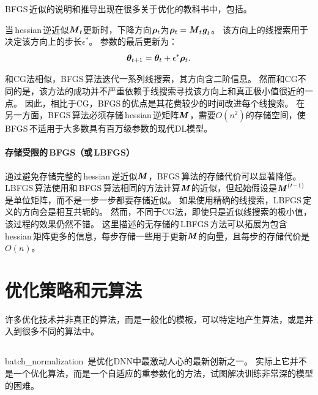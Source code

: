 
\gls{BFGS}\,近似的说明和推导出现在很多关于优化的教科书中，包括\cite{Lue84}。

当\,\gls{hessian}\,逆近似$\boldsymbol{\mathit{M}}_t$更新时，下降方向$\boldsymbol{\rho}_t$为$\boldsymbol{\rho}_t = \boldsymbol{\mathit{M}}_t \boldsymbol{\mathit{g}}_t$。
该方向上的线搜索用于决定该方向上的步长$\epsilon^*$。
参数的最后更新为：
\begin{equation}
    \boldsymbol{\theta}_{t+1} = \boldsymbol{\theta}_t + \epsilon^* \boldsymbol{\rho}_t.
\end{equation}

和\gls{CG}法相似，\gls{BFGS}\,算法迭代一系列线搜索，其方向含二阶信息。
然而和\gls{CG}不同的是，该方法的成功并不严重依赖于线搜索寻找该方向上和真正极小值很近的一点。
因此，相比于\gls{CG}，\gls{BFGS}\,的优点是其花费较少的时间改进每个线搜索。
在另一方面，\gls{BFGS}\,算法必须存储\,\gls{hessian}\,逆矩阵$\boldsymbol{\mathit{M}}$，需要$O(n^2)$的存储空间，使\,\gls{BFGS}\,不适用于大多数具有百万级参数的现代\gls{DL}模型。

\paragraph{存储受限的\,\gls{BFGS}（或\,\gls{LBFGS}）}
通过避免存储完整的\,\gls{hessian}\,逆近似$\boldsymbol{\mathit{M}}$，\gls{BFGS}\,算法的存储代价可以显著降低。
\gls{LBFGS}\,算法使用和\,\gls{BFGS}\,算法相同的方法计算$\boldsymbol{\mathit{M}}$的近似，但起始假设是$\boldsymbol{\mathit{M}}^{(t-1)}$是单位矩阵，而不是一步一步都要存储近似。
如果使用精确的线搜索，\gls{LBFGS}\,定义的方向会是相互共轭的。
然而，不同于\gls{CG}法，即使只是近似线搜索的极小值，该过程的效果仍然不错。
这里描述的无存储的\,\gls{LBFGS}\,方法可以拓展为包含\,\gls{hessian}\,矩阵更多的信息，每步存储一些用于更新$\boldsymbol{\mathit{M}}$的向量，且每步的存储代价是$O(n)$。


\section{优化策略和元算法}
\label{sec:optimization_strategies_and_meta_algorithms}
许多优化技术并非真正的算法，而是一般化的模板，可以特定地产生算法，或是并入到很多不同的算法中。

\subsection{}
\label{sec:batch_normalization}
\gls{batch_normalization}~\citep{Ioffe+Szegedy-2015}是优化\gls{DNN}中最激动人心的最新创新之一。
实际上它并不是一个优化算法，而是一个自适应的重参数化的方法，试图解决训练非常深的模型的困难。

